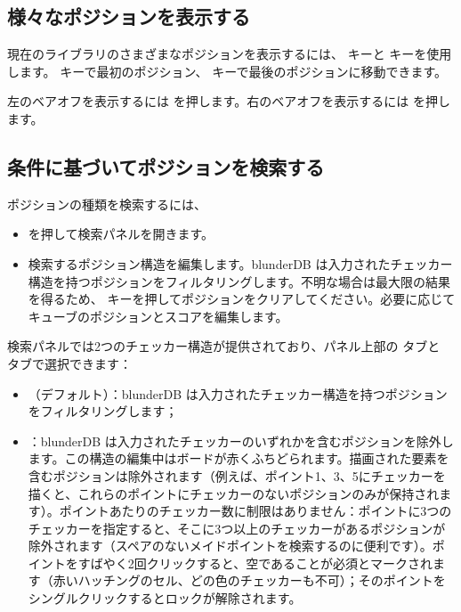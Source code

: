 \documentclass[letterpaper,10pt,dvipdfmx]{sphinxmanual}
\begin{document}
\subsection{様々なポジションを表示する}
\label{\detokenize{guide_utilisateur:visualiser-les-differentes-positions}}
\sphinxAtStartPar
現在のライブラリのさまざまなポジションを表示するには、 キーと  キーを使用します。 キーで最初のポジション、 キーで最後のポジションに移動できます。

\sphinxAtStartPar
左のベアオフを表示するには  を押します。右のベアオフを表示するには  を押します。


\subsection{条件に基づいてポジションを検索する}
\label{\detokenize{guide_utilisateur:rechercher-des-positions-selon-des-criteres}}
\sphinxAtStartPar
ポジションの種類を検索するには、
\begin{itemize}
\item {} 
\sphinxAtStartPar
{} を押して検索パネルを開きます。

\item {} 
\sphinxAtStartPar
検索するポジション構造を編集します。blunderDB は入力されたチェッカー構造を持つポジションをフィルタリングします。不明な場合は最大限の結果を得るため、 キーを押してポジションをクリアしてください。必要に応じてキューブのポジションとスコアを編集します。

\end{itemize}

\sphinxAtStartPar
検索パネルでは2つのチェッカー構造が提供されており、パネル上部の  タブと  タブで選択できます：
\begin{itemize}
\item {} 
\sphinxAtStartPar
{}（デフォルト）：blunderDB は入力されたチェッカー構造を持つポジションをフィルタリングします；

\item {} 
\sphinxAtStartPar
{}：blunderDB は入力されたチェッカーのいずれかを含むポジションを除外します。この構造の編集中はボードが赤くふちどられます。描画された要素を含むポジションは除外されます（例えば、ポイント1、3、5にチェッカーを描くと、これらのポイントにチェッカーのないポジションのみが保持されます）。ポイントあたりのチェッカー数に制限はありません：ポイントに3つのチェッカーを指定すると、そこに3つ以上のチェッカーがあるポジションが除外されます（スペアのないメイドポイントを検索するのに便利です）。ポイントをすばやく2回クリックすると、空であることが必須とマークされます（赤いハッチングのセル、どの色のチェッカーも不可）；そのポイントをシングルクリックするとロックが解除されます。

\end{itemize}
\end{document}
